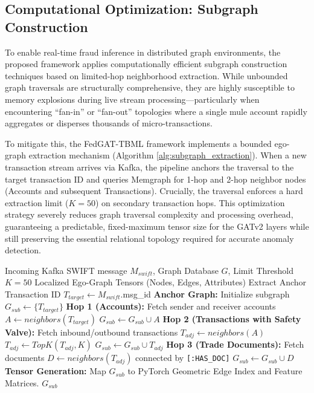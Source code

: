 \documentclass[conference]{IEEEtran}
\newcommand{\projectname}{FedGAT-TBML}
\begin{document}
\subsection{\textbf{Computational Optimization: Subgraph Construction}}

To enable real-time fraud inference in distributed graph environments, the proposed framework applies computationally efficient subgraph construction techniques based on limited-hop neighborhood extraction. While unbounded graph traversals are structurally comprehensive, they are highly susceptible to memory explosions during live stream processing—particularly when encountering ``fan-in'' or ``fan-out'' topologies where a single mule account rapidly aggregates or disperses thousands of micro-transactions.

To mitigate this, the \projectname{} framework implements a bounded ego-graph extraction mechanism (Algorithm \ref{alg:subgraph_extraction}). When a new transaction stream arrives via Kafka, the pipeline anchors the traversal to the target transaction ID and queries Memgraph for 1-hop and 2-hop neighbor nodes (Accounts and subsequent Transactions). Crucially, the traversal enforces a hard extraction limit ($K=50$) on secondary transaction hops. This optimization strategy severely reduces graph traversal complexity and processing overhead, guaranteeing a predictable, fixed-maximum tensor size for the GATv2 layers while still preserving the essential relational topology required for accurate anomaly detection.

\begin{algorithm}[t]
\caption{Real-Time Bounded Subgraph Extraction}
\label{alg:subgraph_extraction}
\begin{algorithmic}[1]
\renewcommand{\algorithmicrequire}{\textbf{Input:}}
\renewcommand{\algorithmicensure}{\textbf{Output:}}
\REQUIRE Incoming Kafka SWIFT message $M_{swift}$, Graph Database $G$, Limit Threshold $K=50$
\ENSURE Localized Ego-Graph Tensors (Nodes, Edges, Attributes)
\STATE Extract Anchor Transaction ID $T_{target} \leftarrow M_{swift}$.msg\_id
\STATE \textbf{Anchor Graph:} Initialize subgraph $G_{sub} \leftarrow \{T_{target}\}$
\STATE \textbf{Hop 1 (Accounts):} 
\STATE Fetch sender and receiver accounts $A \leftarrow neighbors(T_{target})$
\STATE $G_{sub} \leftarrow G_{sub} \cup A$
\STATE \textbf{Hop 2 (Transactions with Safety Valve):}
\STATE Fetch inbound/outbound transactions $T_{adj} \leftarrow neighbors(A)$
    \STATE $T_{adj} \leftarrow TopK(T_{adj}, K)$ 
\ENDIF
\STATE $G_{sub} \leftarrow G_{sub} \cup T_{adj}$
\STATE \textbf{Hop 3 (Trade Documents):}
\STATE Fetch documents $D \leftarrow neighbors(T_{adj})$ connected by \texttt{[:HAS\_DOC]}
\STATE $G_{sub} \leftarrow G_{sub} \cup D$
\STATE \textbf{Tensor Generation:} Map $G_{sub}$ to PyTorch Geometric Edge Index and Feature Matrices.
\RETURN $G_{sub}$
\end{algorithmic}
\end{algorithm}
\end{document}
